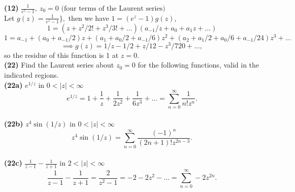 \documentclass[12pt,letterpaper]{article}
\begin{document}
\textbf{(12)} \(\frac{1}{e^{z}-1},\ z_{0} = 0 \text{ (four terms of the Laurent series)}\) \\

Let \(g(z) = \frac{1}{e^{z}-1}\},\) then we have \(1 = (e^{z}-1)g(z)\), \[1 = (z + z^{2}/2! + z^{3}/3! + ...)(a_{-1}/z + a_{0} + a_{1}z + ...)\] \[1 = a_{-1} + (a_{0} + a_{-1}/2)z + (a_{1} + a_{0}/2 + a_{-1}/6)z^{2} + (a_{2} + a_{1}/2 + a_{0}/6 + a_{-1}/24)z^{3} + ...\] \[\implies g(z) = 1/z - 1/2 + z/12 - z^{3}/720 + ...,\] so the residue of this function is 1 at \(z = 0\). \\

\textbf{(22)} Find the Laurent series about \(z_{0} = 0\) for the following functions, valid in the indicated regions. \\

\textbf{(22a)} \(e^{1/z}\) in \(0 < |z| < \infty\) \\

\[e^{1/z} = 1 + \frac{1}{z} + \frac{1}{2z^{2}} + \frac{1}{6z^{3}} + ... = \sum_{n=0}^{\infty} \frac{1}{n!z^{n}}.\]\\

\textbf{(22b)} \(z^{4}\sin(1/z)\) in \(0 < |z| < \infty\) \\

\[z^{4}\sin(1/z) = \sum_{n=0}^{\infty} \frac{(-1)^{n}}{(2n+1)!z^{2n-3}}.\]\\

\textbf{(22c)} \(\frac{1}{z-1} - \frac{1}{z+1}\) in \(2 < |z| < \infty\) \\

\[\frac{1}{z-1}-\frac{1}{z+1} = \frac{2}{z^{2}-1} = -2 - 2z^{2} - ... = \sum_{n=0}^{\infty} -2z^{2n}.\]
\end{document}
